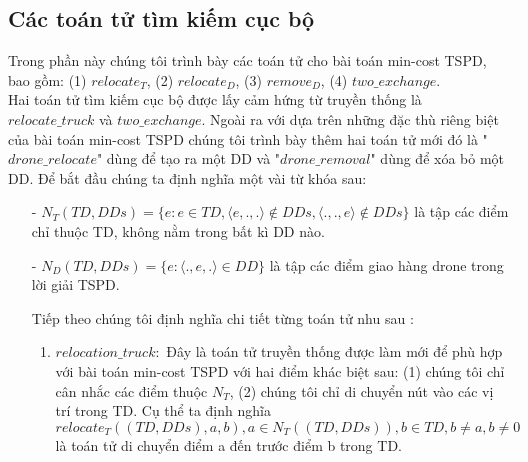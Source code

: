 \documentclass[a4paper,12pt]{report}
\begin{document}
\subsection{Các toán tử tìm kiếm cục bộ}
Trong phần này chúng tôi trình bày các toán tử  cho bài toán min-cost TSPD, bao gồm: (1) $relocate_T$, (2) $relocate_D$, (3) $remove_D$, (4) $two\_exchange$. \\

Hai toán tử tìm kiếm cục bộ được lấy cảm hứng từ truyền thống là $relocate\_truck$ và $two\_exchange$. Ngoài ra với dựa trên những đặc thù riêng biệt của bài toán min-cost TSPD chúng tôi trình bày thêm hai toán tử mới đó là "$drone\_relocate$" dùng để tạo ra một DD và "$drone\_removal$" dùng để xóa bỏ một DD. Để bắt đầu chúng ta định nghĩa một vài từ khóa sau:
\begin{itemize}
\item[-] $N_T(TD,DDs)=\{e:e \in TD,\langle e,.,. \rangle \notin DDs,\langle .,.,e \rangle \notin DDs\}$ là tập các điểm chỉ thuộc TD, không nằm trong bất kì DD nào.
\item[-] $N_D(TD,DDs)=\{e: \langle .,e,. \rangle \in DD\}$ là tập các điểm giao hàng drone trong lời giải TSPD.

Tiếp theo chúng tôi định nghĩa chi tiết từng toán tử nhu sau :
\begin{enumerate}
\item $relocation\_truck:$ Đây là toán tử truyền thống được làm mới để phù hợp với bài toán min-cost TSPD với hai điểm khác biệt sau: (1) chúng tôi chỉ cân nhắc các điểm thuộc $N_T$, (2) chúng tôi chỉ di chuyển nút vào các vị trí trong TD. Cụ thể ta định nghĩa
$$relocate_T((TD,DDs),a,b),a \in N_T((TD,DDs)),b \in TD, b \neq a, b \neq 0$$ 
là toán tử di chuyển điểm a đến trước điểm b trong TD.
\begin{figure}[H]

\end{figure}
\end{enumerate}
\end{itemize}
\end{document}
